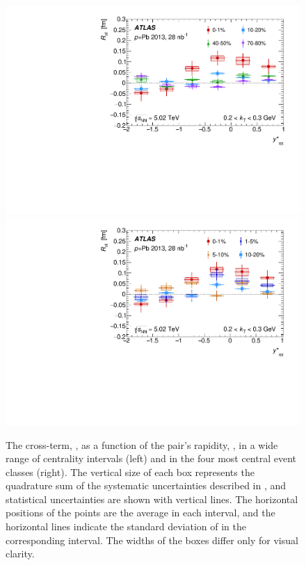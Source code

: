 \begin{figure}[t]
\centering
\includegraphics[width=0.49\linewidth]{canqosl_Rol_kt1_vs_kys.pdf}
\includegraphics[width=0.49\linewidth]{canqosl_Rol_kt1_vs_kys_altcent.pdf}
\caption{The cross-term, \Rol, as a function of the pair's rapidity, \kys, in a wide range of centrality intervals (left) and in the four most central event classes (right). The vertical size of each box represents the quadrature sum of the systematic uncertainties described in , and statistical uncertainties are shown with vertical lines. The horizontal positions of the points are the average \kys in each interval, and the horizontal lines indicate the standard deviation of \kys in the corresponding interval. The widths of the boxes differ only for visual clarity.}
\label{fig:results_Rol_kys}
\end{figure}

